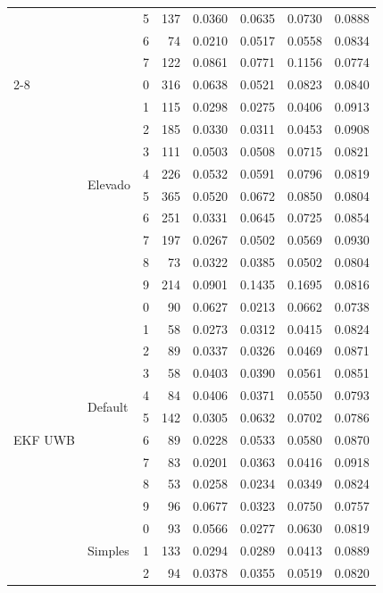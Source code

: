 \begin{table}[htbp]
\begin{tabular}{llrrrrrr}
     &  & 5 & 137 & 0.0360 & 0.0635 & 0.0730 & 0.0888 \\
     &  & 6 & 74 & 0.0210 & 0.0517 & 0.0558 & 0.0834 \\
     &  & 7 & 122 & 0.0861 & 0.0771 & 0.1156 & 0.0774 \\
    \cmidrule(lr){2-8}
     & \multirow{10}{*}{Elevado} & 0 & 316 & 0.0638 & 0.0521 & 0.0823 & 0.0840 \\
     &  & 1 & 115 & 0.0298 & 0.0275 & 0.0406 & 0.0913 \\
     &  & 2 & 185 & 0.0330 & 0.0311 & 0.0453 & 0.0908 \\
     &  & 3 & 111 & 0.0503 & 0.0508 & 0.0715 & 0.0821 \\
     &  & 4 & 226 & 0.0532 & 0.0591 & 0.0796 & 0.0819 \\
     &  & 5 & 365 & 0.0520 & 0.0672 & 0.0850 & 0.0804 \\
     &  & 6 & 251 & 0.0331 & 0.0645 & 0.0725 & 0.0854 \\
     &  & 7 & 197 & 0.0267 & 0.0502 & 0.0569 & 0.0930 \\
     &  & 8 & 73 & 0.0322 & 0.0385 & 0.0502 & 0.0804 \\
     &  & 9 & 214 & 0.0901 & 0.1435 & 0.1695 & 0.0816 \\
    \midrule
    \multirow{34}{*}{EKF UWB} & \multirow{10}{*}{Default} & 0 & 90 & 0.0627 & 0.0213 & 0.0662 & 0.0738 \\
     &  & 1 & 58 & 0.0273 & 0.0312 & 0.0415 & 0.0824 \\
     &  & 2 & 89 & 0.0337 & 0.0326 & 0.0469 & 0.0871 \\
     &  & 3 & 58 & 0.0403 & 0.0390 & 0.0561 & 0.0851 \\
     &  & 4 & 84 & 0.0406 & 0.0371 & 0.0550 & 0.0793 \\
     &  & 5 & 142 & 0.0305 & 0.0632 & 0.0702 & 0.0786 \\
     &  & 6 & 89 & 0.0228 & 0.0533 & 0.0580 & 0.0870 \\
     &  & 7 & 83 & 0.0201 & 0.0363 & 0.0416 & 0.0918 \\
     &  & 8 & 53 & 0.0258 & 0.0234 & 0.0349 & 0.0824 \\
     &  & 9 & 96 & 0.0677 & 0.0323 & 0.0750 & 0.0757 \\
    \cmidrule(lr){2-8}
     & \multirow{6}{*}{Simples} & 0 & 93 & 0.0566 & 0.0277 & 0.0630 & 0.0819 \\
     &  & 1 & 133 & 0.0294 & 0.0289 & 0.0413 & 0.0889 \\
     &  & 2 & 94 & 0.0378 & 0.0355 & 0.0519 & 0.0820 \\

\end{tabular}
\end{table}
